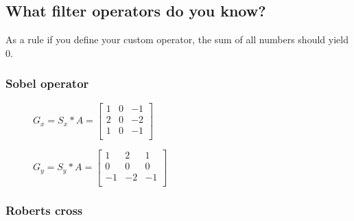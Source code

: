 %
%




\subsection{What filter operators do you know?}
As a rule if you define your custom operator, the sum of all numbers should yield 0.
\subsubsection{Sobel operator}

\begin{figure}[!htb]
    \centering
    \begin{minipage}{.5\textwidth}
        \centering
        $G_{x} = S_{x} * A =
        \left[ \begin{array}{rrr}
        1 & 0 & -1 \\
        2 & 0 & -2 \\
        1 & 0 & -1 \\
        \end{array}\right] $
    \end{minipage}%
    \begin{minipage}{.5\textwidth}
        \centering
        $G_{y} = S_{y} * A =
        \left[ \begin{array}{rrr}
        1 & 2 & 1 \\
        0 & 0 & 0 \\
        -1 & -2 & -1 \\
        \end{array}\right] $
    \end{minipage}
\end{figure}


\subsubsection{Roberts cross}

